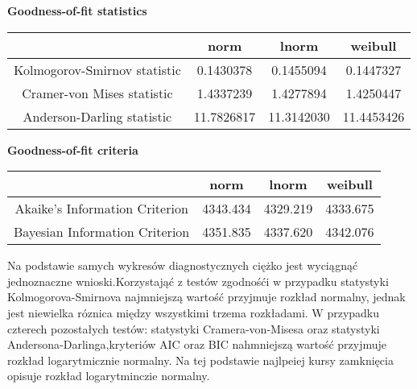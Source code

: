 \documentclass[a4paper,11pt]{article}
\begin{document}

\begin{center} 
{\textbf{Goodness-of-fit statistics}}\\
\begin{tabular}{ |c | c | c| c | } 
  \hline
    &  norm &  lnorm &  weibull  \\ 
  \hline
  Kolmogorov-Smirnov statistic  & 0.1430378 &  0.1455094 & 0.1447327 \\ 
  \hline
   Cramer-von Mises statistic  & 1.4337239    &   1.4277894 &  1.4250447 \\ 
  \hline
   Anderson-Darling statistic  &  11.7826817     & 11.3142030 & 11.4453426 \\ 
  \hline
\end{tabular}
\end{center}


\begin{center} 
{\textbf{Goodness-of-fit criteria}}\\
\begin{tabular}{ |c | c | c| c | } 
  \hline
    &  norm &  lnorm &  weibull  \\ 
  \hline
  Akaike's Information Criterion & 4343.434  &  4329.219 & 4333.675 \\ 
  \hline
   Bayesian Information Criterion & 4351.835 & 4337.620  & 4342.076 \\ 
  \hline
 
\end{tabular}
\end{center}

\begin{flushleft}
{Na podstawie samych wykresów diagnostycznych ciężko jest wyciągnąć jednoznaczne wnioski.Korzystająć z testów zgodnośći w przypadku statystyki Kolmogorova-Smirnova najmniejszą wartość przyjmuje rozkład normalny, jednak jest niewielka róznica między wszystkimi trzema rozkładami. W przypadku czterech pozostałych testów: statystyki Cramera-von-Misesa oraz  statystyki Andersona-Darlinga,kryteriów AIC oraz BIC nahmniejszą wartość przyjmuje rozkład logarytmicznie normalny.
Na tej podstawie najlpeiej kursy zamknięcia opisuje rozkład logarytminczie normalny.}
\end{flushleft}
\end{document}
